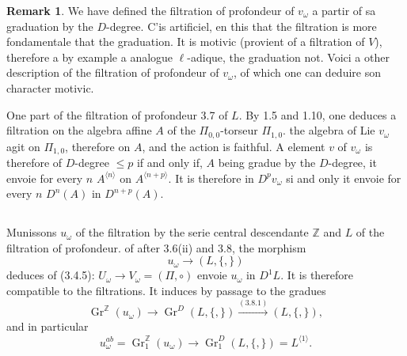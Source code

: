 \documentclass[11pt,a4paper]{article}
\theoremstyle{plain}
\theoremstyle{definition}
\newtheorem{remark}[theorem]{Remark}
\newcommand{\Z}{\mathbb{Z}}
\newcommand{\Gr}{\operatorname{Gr}}
\begin{document}
\begin{remark}\label{rmk:3.9}
We have defined the filtration of profondeur of $v_\omega$ a partir of sa graduation by the $D$-degree. C'is artificiel, en this that the filtration is more fondamentale that the graduation. It is motivic (provient of a filtration of $V$), therefore a by example a analogue $\ell$-adique, the graduation not. Voici a other description of the filtration of profondeur of $v_\omega$, of which one can deduire son character motivic.

One part of the filtration of profondeur 3.7 of $L$. By 1.5 and 1.10, one deduces a filtration on the algebra affine $A$ of the $\Pi_{0,0}$-torseur $\Pi_{1,0}$. the algebra of Lie $v_\omega$ agit on $\Pi_{1,0}$, therefore on $A$, and the action is faithful. A element $v$ of $v_\omega$ is therefore of $D$-degree $\leq p$ if and only if, $A$ being gradue by the $D$-degree, it envoie for every $n$ $A^{\langle n \rangle}$ on $A^{\langle n+p \rangle}$. It is therefore in $D^p v_\omega$ si and only it envoie for every $n$ $D^n(A)$ in $D^{n+p}(A)$.
\end{remark}

\subsection{}
Munissons $u_\omega$ of the filtration by the serie central descendante $\Z$ and $L$ of the filtration of profondeur. of after 3.6(ii) and 3.8, the morphism
\begin{equation}\label{eq:3.10.1}
u_\omega \to (L, \{,\})
\end{equation}
deduces of (3.4.5): $U_\omega \to V_\omega = (\Pi, \circ)$ envoie $u_\omega$ in $D^1L$. It is therefore compatible to the filtrations. It induces by passage to the gradues
\begin{equation}\label{eq:3.10.2}
\Gr^\Z(u_\omega) \to \Gr^D(L, \{,\}) \xrightarrow{(3.8.1)} (L, \{,\}),
\end{equation}
and in particular
\begin{equation}\label{eq:3.10.3}
u_\omega^{ab} = \Gr_1^\Z(u_\omega) \to \Gr_1^D(L, \{,\}) = L^{\langle 1 \rangle}.
\end{equation}
\end{document}
